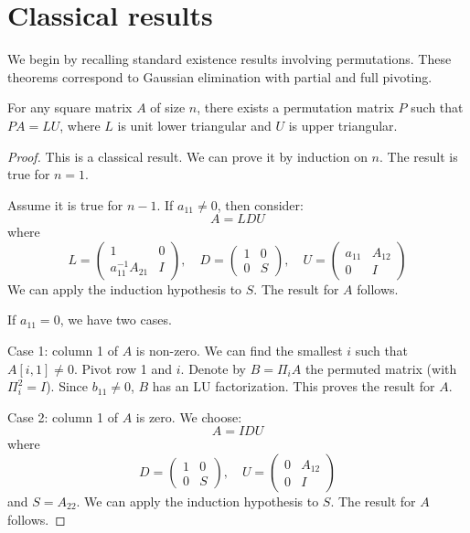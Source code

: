 \documentclass[10pt,twoside]{siamart1116}
\numberwithin{theorem}{section}
\begin{document}
\section{Classical results}\label{sec:classical}

We begin by recalling standard existence results involving permutations. These theorems correspond to Gaussian elimination with partial and full pivoting.

\begin{theorem}\label{thm:row_permutation}
	For any square matrix $A$ of size $n$, there exists a permutation matrix $P$ such that $PA = LU$, where $L$ is unit lower triangular and $U$ is upper triangular.
\end{theorem}

\begin{proof}
	This is a classical result. We can prove it by induction on $n$. The result is true for $n=1$.

	Assume it is true for $n-1$. If $a_{11} \neq 0$, then consider:
	\[
		A = LDU
	\]
	where
	\[
		L = \begin{pmatrix}
			1                  & 0 \\
			a_{11}^{-1} A_{21} & I
		\end{pmatrix}, \quad
		D = \begin{pmatrix}
			1 & 0 \\
			0 & S
		\end{pmatrix}, \quad
		U = \begin{pmatrix}
			a_{11} & A_{12} \\
			0      & I
		\end{pmatrix}
	\]
	We can apply the induction hypothesis to $S$. The result for $A$ follows.

	If $a_{11} = 0$, we have two cases.

	Case 1: column 1 of $A$ is non-zero. We can find the smallest $i$ such that $A[i,1] \neq 0$. Pivot row 1 and $i$. Denote by $B = \Pi_i A$ the permuted matrix (with $\Pi_i^2 = I$). Since $b_{11} \neq 0$, $B$ has an LU factorization. This proves the result for $A$.

	Case 2: column 1 of $A$ is zero. We choose:
	\[
		A = I D U
	\]
	where
	\[
		D = \begin{pmatrix}
			1 & 0 \\
			0 & S
		\end{pmatrix}, \quad
		U = \begin{pmatrix}
			0 & A_{12} \\
			0 & I
		\end{pmatrix}
	\]
	and $S=A_{22}$. We can apply the induction hypothesis to $S$. The result for $A$ follows.
\end{proof}
\end{document}
